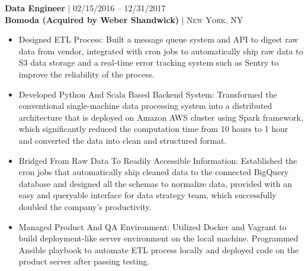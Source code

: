 {\raggedright\normalsize
\textbf{Data Engineer} {\hfill\footnotesize\textsc{| 02/15/2016 -- 12/31/2017}}\\ 
\textbf{Bomoda (Acquired by Weber Shandwick)} {\hfill\footnotesize\textsc{| New York, NY}}}

\begin{itemize}[leftmargin=*, topsep=2pt, partopsep=2.5pt]
\setlength\itemsep{1pt}

\item Designed ETL Process: Built a message queue system and API to digest raw data from vendor, integrated with cron jobs to automatically ship raw data to S3 data storage and a real-time error tracking system such as Sentry to improve the reliability of the process.

\item Developed Python And Scala Based Backend System: Transformed the conventional single-machine data processing system into a distributed architecture that is deployed on Amazon AWS cluster using Spark framework, which significantly reduced the computation time from 10 hours to 1 hour and converted the data into clean and structured format.

\item Bridged From Raw Data To Readily Accessible Information: Established the cron jobs that automatically ship cleaned data to the connected BigQuery database and designed all the schemas to normalize data, provided with an easy and queryable interface for data strategy team, which successfully doubled the company's productivity.

\item Managed Product And QA Environment: Utilized Docker and Vagrant to build deployment-like server environment on the local machine. Programmed Ansible playbook to automate ETL process locally and deployed code on the product server after passing testing.

\end{itemize}
